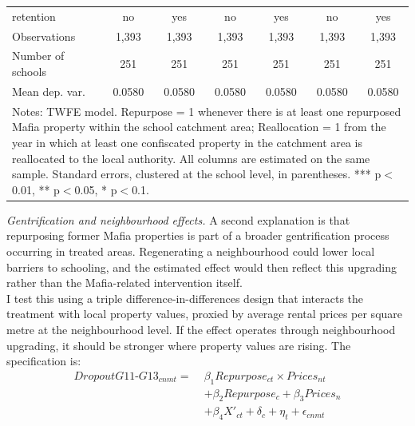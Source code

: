 \documentclass[12pt]{article}
\theoremstyle{plain}
\theoremstyle{plain}
\theoremstyle{plain}
\theoremstyle{definition}
\theoremstyle{plain}
\theoremstyle{definition}
\theoremstyle{plain}
\theoremstyle{remark}
\theoremstyle{definition}
\theoremstyle{definition}
\theoremstyle{plain}
\begin{document}
\begin{table}[H]
{\begin{tabular}{p{7.39em}llllll}
			\multicolumn{1}{l}{retention} & \multicolumn{1}{c}{no} & \multicolumn{1}{c}{yes} & \multicolumn{1}{c}{no} & \multicolumn{1}{c}{yes} & \multicolumn{1}{c}{no} & \multicolumn{1}{c}{yes} \\
			\multicolumn{1}{l}{Observations} & \multicolumn{1}{c}{1,393} & \multicolumn{1}{c}{1,393} & \multicolumn{1}{c}{1,393} & \multicolumn{1}{c}{1,393} & \multicolumn{1}{c}{1,393} & \multicolumn{1}{c}{1,393} \\
			\multicolumn{1}{l}{Number of schools} & \multicolumn{1}{c}{251} & \multicolumn{1}{c}{251} & \multicolumn{1}{c}{251} & \multicolumn{1}{c}{251} & \multicolumn{1}{c}{251} & \multicolumn{1}{c}{251} \\
			\multicolumn{1}{l}{Mean dep. var.} & \multicolumn{1}{c}{0.0580} & \multicolumn{1}{c}{0.0580} & \multicolumn{1}{c}{0.0580} & \multicolumn{1}{c}{0.0580} & \multicolumn{1}{c}{0.0580} & \multicolumn{1}{c}{0.0580} \\
			\midrule
			\multicolumn{7}{p{37.39em}}{Notes: TWFE model. Repurpose = 1 whenever there is at least one repurposed Mafia property within the school catchment area; Reallocation = 1 from the year in which at least one confiscated property in the catchment area is reallocated to the local authority. All columns are estimated on the same sample. Standard errors, clustered at the school level, in parentheses. *** p$<$0.01, ** p$<$0.05, * p$<$0.1.} \\
		\end{tabular}%
	}
\end{table}


\emph{Gentrification and neighbourhood effects.} A second explanation is that repurposing former Mafia properties is part of a broader gentrification process occurring in treated areas. Regenerating a neighbourhood could lower local barriers to schooling, and the estimated effect would then reflect this upgrading rather than the Mafia-related intervention itself. \\
I test this using a triple difference-in-differences design that interacts the treatment with local property values, proxied by average rental prices per square metre at the neighbourhood level. If the effect operates through neighbourhood upgrading, it should be stronger where property values are rising. The specification is:
\begin{equation} \label{continuous_spec}
	\begin{aligned}
		DropoutG11\text{-}G13_{cnmt} =\; & \beta_1 Repurpose_{ct} \times Prices_{nt} \\
		& + \beta_2 Repurpose_{c} + \beta_3 Prices_{n} \\
		& + \beta_4 X'_{ct} + \delta_c + \eta_t + \epsilon_{cnmt}
	\end{aligned}
\end{equation}
\end{document}
